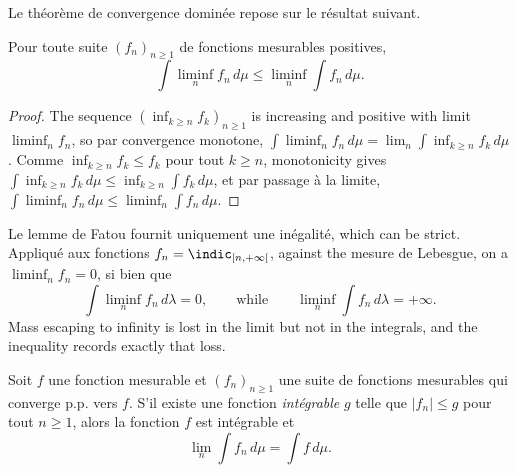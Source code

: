 Le théorème de convergence dominée repose sur le résultat suivant.

\begin{lemma}
  Pour toute suite $(f_{n})_{n \geq 1}$ de fonctions mesurables positives,
  \[
    \int \liminf_{n} f_{n} \, d\mu \leq \liminf_{n} \int f_{n} \, d\mu .
  \]
\end{lemma}

\begin{proof}
  The sequence $( \inf_{k \geq n} f_{k} )_{n \geq 1}$ is increasing and positive with
  limit $\liminf_{n} f_{n}$, so par convergence monotone, $\int \liminf_{n} f_{n} \,
  d\mu = \lim_{n} \int \inf_{k \geq n} f_{k} \, d\mu$. Comme $\inf_{k \geq n} f_{k}
  \leq f_{k}$ pour tout $k \geq n$, monotonicity gives $\int \inf_{k \geq n} f_{k}
  \, d\mu \leq \inf_{k \geq n} \int f_{k} \, d\mu$, et par passage à la limite,
  $\int \liminf_{n} f_{n} \, d\mu \leq \liminf_{n} \int f_{n} \, d\mu$.
\end{proof}

\begin{remark}
  Le lemme de Fatou fournit uniquement une inégalité, which can be strict. Appliqué
  aux fonctions $f_{n} = \indic_{[n,+\infty[}$, against the mesure de Lebesgue, on a
  $\liminf_{n} f_{n} = 0$, si bien que
  \[
    \int \liminf_{n} f_{n} \, d\lambda = 0 ,
    \qquad \text{while} \qquad
    \liminf_{n} \int f_{n} \, d\lambda = +\infty .
  \]
  Mass escaping to infinity is lost in the limit but not in the integrals, and the
  inequality records exactly that loss.
\end{remark}

\begin{theorem}
  Soit $f$ une fonction mesurable et $(f_{n})_{n \geq 1}$ une suite de fonctions
  mesurables qui converge p.p. vers $f$. S'il existe une fonction \emph{intégrable}
  $g$ telle que $|f_{n}| \leq g$ pour tout $n \geq 1$, alors la fonction $f$ est
  intégrable et
  \[
    \lim_{n} \int f_{n} \, d\mu = \int f \, d\mu .
  \]
\end{theorem}

